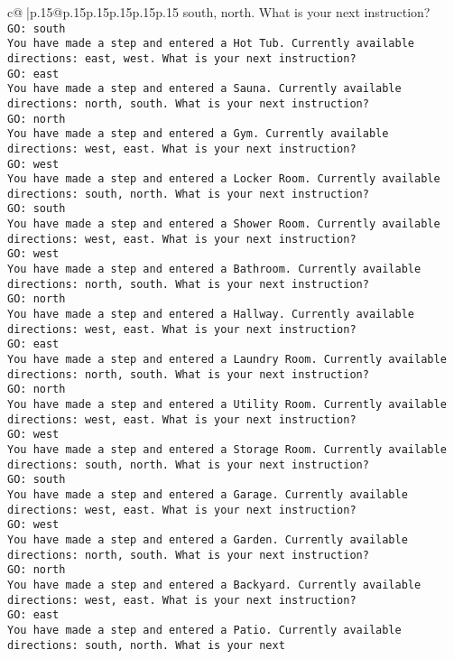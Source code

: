 \documentclass{article}
\begin{document}
{\begin{supertabular}{c@{$\;$}|p{.15\linewidth}@{}p{.15\linewidth}p{.15\linewidth}p{.15\linewidth}p{.15\linewidth}p{.15\linewidth}}
{{{south, north. What is your next instruction?\\ \tt GO: south\\ \tt You have made a step and entered a Hot Tub. Currently available directions: east, west. What is your next instruction?\\ \tt GO: east\\ \tt You have made a step and entered a Sauna. Currently available directions: north, south. What is your next instruction?\\ \tt GO: north\\ \tt You have made a step and entered a Gym. Currently available directions: west, east. What is your next instruction?\\ \tt GO: west\\ \tt You have made a step and entered a Locker Room. Currently available directions: south, north. What is your next instruction?\\ \tt GO: south\\ \tt You have made a step and entered a Shower Room. Currently available directions: west, east. What is your next instruction?\\ \tt GO: west\\ \tt You have made a step and entered a Bathroom. Currently available directions: north, south. What is your next instruction?\\ \tt GO: north\\ \tt You have made a step and entered a Hallway. Currently available directions: west, east. What is your next instruction?\\ \tt GO: east\\ \tt You have made a step and entered a Laundry Room. Currently available directions: north, south. What is your next instruction?\\ \tt GO: north\\ \tt You have made a step and entered a Utility Room. Currently available directions: west, east. What is your next instruction?\\ \tt GO: west\\ \tt You have made a step and entered a Storage Room. Currently available directions: south, north. What is your next instruction?\\ \tt GO: south\\ \tt You have made a step and entered a Garage. Currently available directions: west, east. What is your next instruction?\\ \tt GO: west\\ \tt You have made a step and entered a Garden. Currently available directions: north, south. What is your next instruction?\\ \tt GO: north\\ \tt You have made a step and entered a Backyard. Currently available directions: west, east. What is your next instruction?\\ \tt GO: east\\ \tt You have made a step and entered a Patio. Currently available directions: south, north. What is your next }}}
\end{supertabular}}
\end{document}
